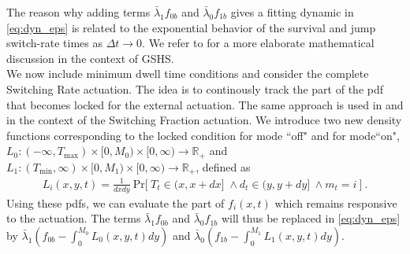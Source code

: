 \documentclass[submission,copyright,creativecommons]{eptcs}
\begin{document}
The reason why adding terms $\bar{\lambda}_1 f_{0b}$ and  $\bar{ \lambda}_0 f_{1b}$ gives a fitting dynamic in \eqref{eq:dyn_eps} is related to the exponential behavior of the survival and jump switch-rate times as $\Delta t \rightarrow 0$. We refer to \cite{bect2010unifying} for a more elaborate mathematical discussion in the context of GSHS. \\

We now include minimum dwell time conditions and consider the complete Switching Rate actuation. The idea is to continously track the part of the pdf that becomes locked for the external actuation. The same approach is used in \cite{zhang2013aggregated} and \cite{totu2014demand} in the context of the Switching Fraction actuation. We introduce two new density functions corresponding to the locked condition for mode ``off" and  for mode``on", $L_0:(-\infty, T_{\max}) \times [0,M_0) \times [0, \infty) \rightarrow \mathbb{R}_{+}$ and $L_1:(T_{\min}, \infty) \times [0,M_1) \times [0, \infty) \rightarrow \mathbb{R}_{+}$, defined as
\begin{align}
	L_i(x,y,t) = \frac{1}{dxdy}~ \mathrm{Pr}\big[ \hspace{3pt}T_t \in ( x, x + dx] \hspace{3pt} \wedge d_t \in  ( y, y+ dy] \hspace{3pt} \wedge  m_t=i  ~\big]~. \label{def:pdf_locked}
\end{align}
Using these pdfs, we can evaluate the part of $f_i(x,t)$ which remains responsive to the actuation. The terms $\bar{\lambda}_1 f_{0b}$ and  $\bar{ \lambda}_0 f_{1b}$  will thus be replaced in \eqref{eq:dyn_eps} by  $\bar{\lambda}_1 \left( f_{0b} - \int_{0}^{M_0} L_0(x,y,t) dy \right)$ and $\bar{\lambda}_0 \left( f_{1b} - \int_{0}^{M_1} L_1(x,y,t) dy \right)$.
\end{document}
